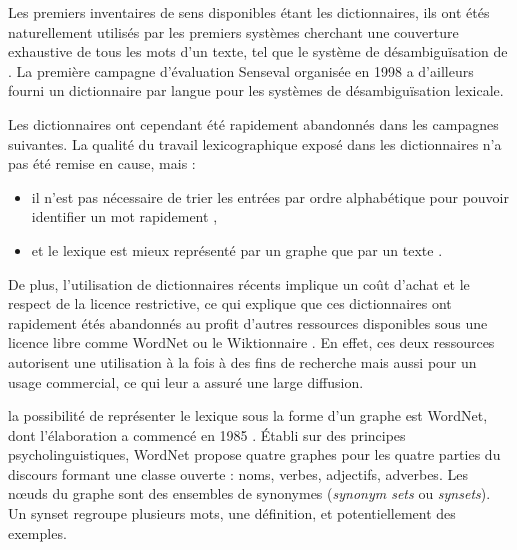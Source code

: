 Les premiers inventaires de sens disponibles étant les dictionnaires, ils ont
étés naturellement utilisés par les premiers systèmes cherchant une couverture
exhaustive de tous les mots d'un texte, tel que le système de désambiguïsation
de \cite{lesk1986automatic}. La première campagne d'évaluation Senseval
organisée en 1998 \citep{kilgarriff2000introduction} a d'ailleurs fourni un
dictionnaire par langue pour les systèmes de désambiguïsation lexicale.

Les dictionnaires ont cependant été rapidement abandonnés dans les campagnes
suivantes. La qualité du travail lexicographique exposé dans les dictionnaires
n'a pas été remise en cause, mais :
\begin{itemize}

    \item il n'est pas nécessaire de trier les entrées par ordre alphabétique
        pour pouvoir identifier un mot rapidement
        \citep{miller1990introduction},

    \item et le lexique est mieux représenté par un graphe que par un texte
        \citep{polguere2013tissage}.

\end{itemize}

De plus, l'utilisation de dictionnaires récents implique un coût d'achat et le
respect de la licence restrictive, ce qui explique que ces dictionnaires ont
rapidement étés abandonnés au profit d'autres ressources disponibles sous une
licence libre comme WordNet \citep{edmonds2002introduction} ou le Wiktionnaire
\citep{mouton2010jaws,nguyen2012using}. En effet, ces deux ressources
autorisent une utilisation à la fois à des fins de recherche mais aussi pour un
usage commercial, ce qui leur a assuré une large diffusion.

la possibilité de représenter le lexique sous la forme d'un graphe est WordNet,
dont l'élaboration a commencé en 1985 \citep{miller1990introduction}. Établi
sur des principes psycholinguistiques, WordNet propose quatre graphes pour les
quatre parties du discours formant une classe ouverte : noms, verbes,
adjectifs, adverbes. Les nœuds du graphe sont des ensembles de synonymes
(\emph{synonym sets} ou \emph{synsets}). Un synset regroupe plusieurs mots, une
définition, et potentiellement des exemples.

